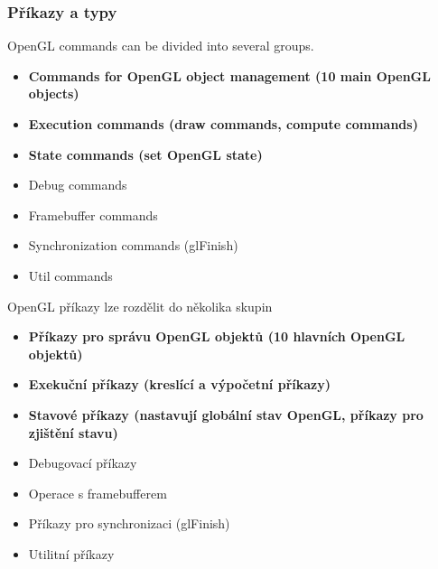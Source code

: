\begin{frame}\frametitle{Příkazy a typy}
\scriptsize
OpenGL commands can be divided into several groups.
\begin{itemize}
  \item \textbf{Commands for OpenGL object management (10 main OpenGL objects)}
  \item \textbf{Execution commands (draw commands, compute commands)}
  \item \textbf{State commands (set OpenGL state)}
  \item Debug commands
  \item Framebuffer commands
  \item Synchronization commands (glFinish)
  \item Util commands
\end{itemize}

OpenGL příkazy lze rozdělit do několika skupin
\begin{itemize}
  \item \textbf{Příkazy pro správu OpenGL objektů (10 hlavních OpenGL objektů)}
  \item \textbf{Exekuční příkazy (kreslící a výpočetní příkazy)}
  \item \textbf{Stavové příkazy (nastavují globální stav OpenGL, příkazy pro zjištění stavu)}
  \item Debugovací příkazy
  \item Operace s framebufferem
  \item Příkazy pro synchronizaci (glFinish)
  \item Utilitní příkazy
\end{itemize}
\end{frame}


